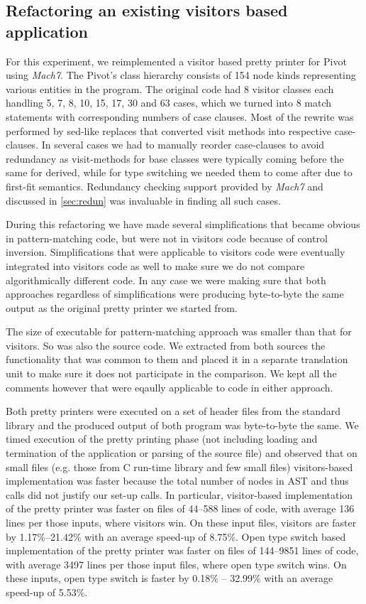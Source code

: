 \subsection{Refactoring an existing visitors based application}
\label{sec:qualcmp}

For this experiment, we reimplemented a visitor based \Cpp{} pretty printer for 
Pivot\cite{Pivot09} using \emph{Mach7}. The Pivot's class hierarchy 
consists of 154 node kinds representing various entities in the \Cpp{} program. The 
original code had 8 visitor classes each handling 5, 7, 8, 10, 15, 17, 30 and 63 
cases, which we turned into 8 match statements with corresponding numbers of 
case clauses. Most of the rewrite was performed by sed-like replaces that 
converted visit methods into respective case-clauses. In several cases we had to 
manually reorder case-clauses to avoid redundancy as visit-methods for base classes 
were typically coming before the same for derived, while for type switching we 
needed them to come after due to first-fit semantics. Redundancy checking 
support provided by \emph{Mach7} and discussed in \textsection\ref{sec:redun} was invaluable in finding all such cases.

During this refactoring we have made several simplifications that became obvious 
in pattern-matching code, but were not in visitors code because of control 
inversion. Simplifications that were applicable to visitors code were eventually 
integrated into visitors code as well to make sure we do not compare 
algorithmically different code. In any case we were making sure that both 
approaches regardless of simplifications were producing byte-to-byte the same 
output as the original pretty printer we started from.

The size of executable for pattern-matching approach was smaller than that for 
visitors. So was also the source code. We extracted from both sources the 
functionality that was common to them and placed it in a separate translation 
unit to make sure it does not participate in the comparison. We kept all the 
comments however that were eqaully applicable to code in either approach.

Both pretty printers were executed on a set of header files from the \Cpp{} 
standard library and the produced output of both program was byte-to-byte the same. 
We timed execution of the pretty printing phase (not including loading and termination 
of the application or parsing of the source file) and observed that on small 
files (e.g. those from C run-time library and few small \Cpp{} files) 
visitors-based implementation was faster because the total number of nodes in 
AST and thus calls did not justify our set-up calls. In particular, 
visitor-based implementation of the pretty printer was faster on files of 44--588  
lines of code, with average 136 lines per those inputs, where visitors win. On 
these input files, visitors are faster by 1.17\%--21.42\% with an average speed-up of 
8.75\%. Open type switch based implementation of the pretty printer was faster on 
files of 144--9851 lines of code, with average 3497 lines per those input files, 
where open type switch wins. On these inputs, open type switch is faster by 0.18\% -- 32.99\% 
with an average speed-up of 5.53\%.

